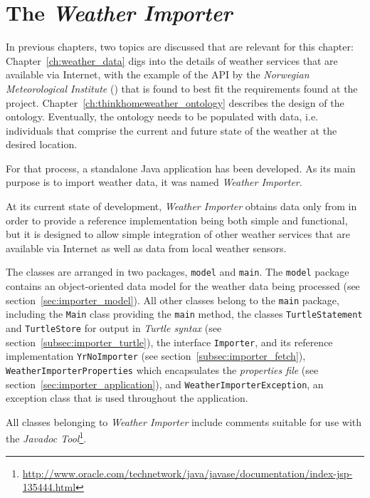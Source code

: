\chapter{The \emph{Weather Importer}}
\label{ch:weather}

In previous chapters, two topics are discussed that are relevant for this chapter: Chapter~\ref{ch:weather_data} digs into the details of weather services that are available via Internet, with the example of the API by the \emph{Norwegian Meteorological Institute} (\yrno) that is found to best fit the requirements found at the \thinkhome project. Chapter~\ref{ch:thinkhomeweather_ontology} describes the design of the \thinkhomeweather ontology. Eventually, the ontology needs to be populated with data, i.e. individuals that comprise the current and future state of the weather at the desired location.

For that process, a standalone Java application has been developed. As its main purpose is to import weather data, it was named \emph{Weather Importer}.

At its current state of development, \emph{Weather Importer} obtains data only from \yrno in order to provide a reference implementation being both simple and functional, but it is designed to allow simple integration of other weather services that are available via Internet as well as data from local weather sensors.

The classes are arranged in two packages, \texttt{model} and \texttt{main}. The \texttt{model} package contains an object-oriented data model for the weather data being processed (see section~\ref{sec:importer_model}). All other classes belong to the \texttt{main} package, including the \texttt{Main} class providing the \texttt{main} method, the classes \texttt{TurtleStatement} and \texttt{TurtleStore} for output in \emph{Turtle syntax}\cite{Turtle} (see section~\ref{subsec:importer_turtle}), the interface \texttt{Importer}, and its reference implementation \texttt{YrNoImporter} (see section~\ref{subsec:importer_fetch}), \texttt{WeatherImporterProperties} which encapsulates the \emph{properties file} (see section~\ref{sec:importer_application}), and \texttt{WeatherImporterException}, an exception class that is used throughout the application.

All classes belonging to \emph{Weather Importer} include comments suitable for use with the \emph{Javadoc Tool}\footnote{\href{http://www.oracle.com/technetwork/java/javase/documentation/index-jsp-135444.html}{http://www.oracle.com/technetwork/java/javase/documentation/index-jsp-135444.html}}.

